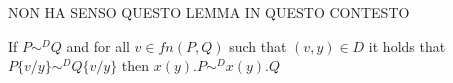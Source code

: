 NON HA SENSO QUESTO LEMMA IN QUESTO CONTESTO
\begin{lemma}\label{strongDEquivalencePreservedByInput}
  If $P \sim^{D} Q$ and for all $v\in fn(P,Q)$ such that $(v,y)\in D$ it holds that $P\{v/y\} \sim^{D} Q\{v/y\}$ then $x(y).P \sim^{D} x(y).Q$
% 
\end{lemma}


